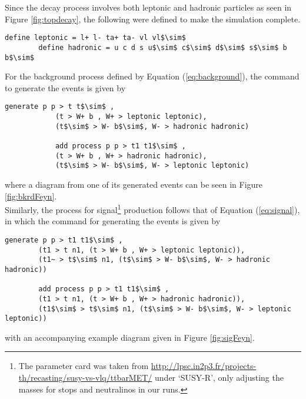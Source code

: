 Since the decay process involves both leptonic and hadronic particles as seen in Figure \ref{fig:topdecay}, the following were defined to make the simulation complete. \\

\begin{lstlisting}[mathescape = true]
        define leptonic = l+ l- ta+ ta- vl vl$\sim$
        define hadronic = u c d s u$\sim$ c$\sim$ d$\sim$ s$\sim$ b b$\sim$
\end{lstlisting}

For the background process defined by Equation (\ref{eq:background}), the command to generate the events is given by
\begin{lstlisting}[mathescape = true]
            generate p p > t t$\sim$ , 
            (t > W+ b , W+ > leptonic leptonic), 
            (t$\sim$ > W- b$\sim$, W- > hadronic hadronic)
        
            add process p p > t1 t1$\sim$ ,
            (t > W+ b , W+ > hadronic hadronic), 
            (t$\sim$ > W- b$\sim$, W- > leptonic leptonic)
\end{lstlisting}
where a diagram from one of its generated events can be seen in Figure \ref{fig:bkrdFeyn}. \\

Similarly, the process for signal\footnote{The parameter card was taken from \url{http://lpsc.in2p3.fr/projects-th/recasting/susy-vs-vlq/ttbarMET/} \cite{kraml2016scalar} under `SUSY-R', only adjusting the masses for stops and neutralinos in our runs.} production follows that of Equation (\ref{eq:signal}), in which the command for generating the events is given by
\begin{lstlisting}[mathescape = true]
        generate p p > t1 t1$\sim$ ,
        (t1 > t n1, (t > W+ b , W+ > leptonic leptonic)),
        (t1~ > t$\sim$ n1, (t$\sim$ > W- b$\sim$, W- > hadronic hadronic))
        
        add process p p > t1 t1$\sim$ , 
        (t1 > t n1, (t > W+ b , W+ > hadronic hadronic)), 
        (t1$\sim$ > t$\sim$ n1, (t$\sim$ > W- b$\sim$, W- > leptonic leptonic))
\end{lstlisting}
with an accompanying example diagram given in Figure \ref{fig:sigFeyn}. \\

